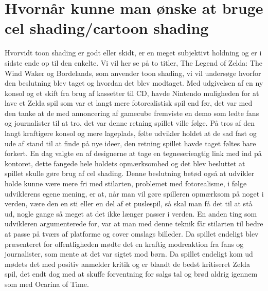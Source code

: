 \newpage
\section{Hvornår kunne man ønske at bruge cel shading/cartoon shading}

Hvorvidt toon shading er godt eller skidt, er en meget subjektivt holdning og er i sidste ende op til den enkelte. Vi vil her se på to titler, The Legend of Zelda: The Wind Waker og Bordelands, som anvender toon shading, vi vil undersøge hvorfor den beslutning blev taget og hvordan det blev modtaget. Med udgivelsen af en ny konsol og et skift fra brug af kassetter til CD, havde Nintendo muligheden for at lave et Zelda spil som var et langt mere fotorealistisk spil end før, det var med den tanke at de med annoncering af gamecube fremviste en demo \cite{Zelda} som ledte fans og journalister til at tro, det var denne retning spillet ville følge. På tros af den langt kraftigere konsol og mere lageplads, følte udvikler holdet at de sad fast og ude af stand til at finde på nye \cite{Zelda} ideer, den retning spillet havde taget føltes bare forkert. En dag valgte en af designerne at tage en  tegneserieagtig  \cite{ToonLinkIsBorn} link med ind på kontoret, dette fangede hele holdets opmærksomhed og det blev besluttet at spillet skulle gøre brug af cel shading. Denne beslutning betød også at udvikler holde kunne være mere fri med stilarten, problemet med fotorealisme, i følge udviklerens egene mening, er at, når man vil gøre spilleren opmærksom på noget i verden, være den en sti eller en del af et puslespil, så skal man få det til at stå ud, nogle gange så meget at det ikke længer passer i verden. En anden ting som udvikleren argumenterede for, var at man med denne teknik får stilarten til bedre at passe på tværs af platforme og cover omslags \cite{nintendo}billeder. Da spillet endeligt blev præsenteret for offentligheden mødte det en kraftig modreaktion fra fans og journalister, som mente at det var sigtet mod 
\cite{nintendo} børn. Da spillet endeligt kom ud mødets det med positiv \cite{BigScore} anmelder kritik og er blandt de bedst kritiseret Zelda spil, det endt dog med at skuffe forventning for salgs tal og brød aldrig igennem som med Ocarina of Time.